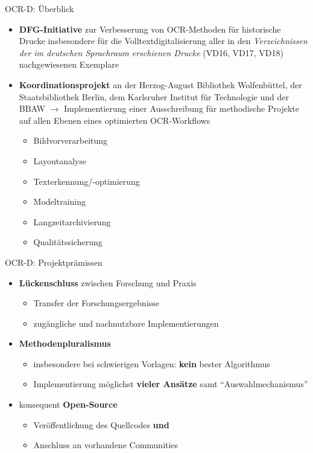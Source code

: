 \documentclass{bbawslides}
\begin{document}
\begin{bbawslide}{OCR-D: Überblick}
  \vspace*{2mm}%
  \centerslidestrue%
  \begin{itemize}
    \item \textbf{DFG-Initiative} zur Verbesserung von OCR-Methoden für historische Drucke insbesondere
          für die Volltextdigitalisierung aller in den \emph{Verzeichnissen der im deutschen
          Sprachraum erschienen Drucke} (VD16, VD17, VD18) nachgewiesenen Exemplare
    \item \textbf{Koordinationsprojekt} an der Herzog-August Bibliothek Wolfenbüttel, der Staatsbibliothek
          Berlin, dem Karlsruher Institut für Technologie und der BBAW $\rightarrow$ Implementierung
          einer Ausschreibung für methodische
          Projekte auf allen Ebenen eines optimierten OCR-Workflows
    \begin{itemize}\small
      \item Bildvorverarbeitung
      \item Layoutanalyse
      \item Texterkennung/-optimierung
      \item Modeltraining
      \item Langzeitarchivierung
      \item Qualitätssicherung
    \end{itemize}
  \end{itemize}
\end{bbawslide}

\begin{bbawslide}{OCR-D: Projektprämissen}
  \vspace*{7mm}%
  \centerslidestrue%
  \begin{itemize}
    \item \textbf{Lückenschluss} zwischen Forschung und Praxis
    \begin{itemize}\small
      \item Transfer der Forschungsergebnisse
      \item zugängliche und nachnutzbare Implementierungen
    \end{itemize}
    \item \textbf{Methodenpluralismus}
    \begin{itemize}\small
      \item insbesondere bei schwierigen Vorlagen: \textbf{kein} bester Algorithmus
      \item Implementierung möglichst \textbf{vieler Ansätze} samt \enquote{Auswahlmechanismus}
    \end{itemize}
    \item konsequent \textbf{Open-Source}
    \begin{itemize}\small
      \item Veröffentlichung des Quellcodes \textbf{und}
      \item Anschluss an vorhandene Communities
    \end{itemize}
  \end{itemize}
\end{bbawslide}
\end{document}

